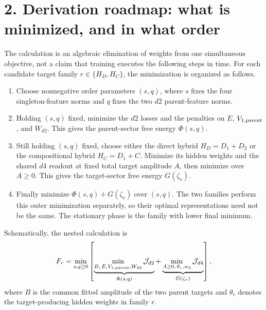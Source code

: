 \documentclass[10pt]{article}
\begin{document}
\section*{2. Derivation roadmap: what is minimized, and in what order}
The calculation is an algebraic elimination of weights from one simultaneous objective, not a
claim that training executes the following steps in time.  For each candidate target family
$r\in\{H_D,H_C\}$, the minimization is organized as follows.
\begin{enumerate}
\item Choose nonnegative order parameters $(s,q)$, where $s$ fixes the four singleton-feature
norms and $q$ fixes the two $d2$ parent-feature norms.
\item Holding $(s,q)$ fixed, minimize the $d2$ losses and the penalties on $E$,
$V_{1,\rm parent}$, and $W_{d2}$.  This gives the parent-sector free energy $\Phi(s,q)$.
\item Still holding $(s,q)$ fixed, choose either the direct hybrid
$H_D=D_1+D_2$ or the compositional hybrid $H_C=D_1+C$.  Minimize its hidden weights and the
shared $d4$ readout at fixed total target amplitude $A$, then minimize over $A\geq0$.  This
gives the target-sector free energy $G(\zeta_r)$.
\item Finally minimize $\Phi(s,q)+G(\zeta_r)$ over $(s,q)$.  The two families perform this
outer minimization separately, so their optimal representations need not be the same.  The
stationary phase is the family with lower final minimum.
\end{enumerate}
Schematically, the nested calculation is
\begin{equation}
F_r=\min_{s,q\geq0}\left[
\underbrace{\min_{B,\,E,V_{1,\rm parent},W_{d2}}\mathcal J_{d2}}_{\Phi(s,q)}+
\underbrace{\min_{A\geq0,\,\theta_r,w_4}\mathcal J_{d4}}_{G(\zeta_r)}
\right],
\label{eq:roadmap}
\end{equation}
where $B$ is the common fitted amplitude of the two parent targets and $\theta_r$ denotes the
target-producing hidden weights in family $r$.
\end{document}
